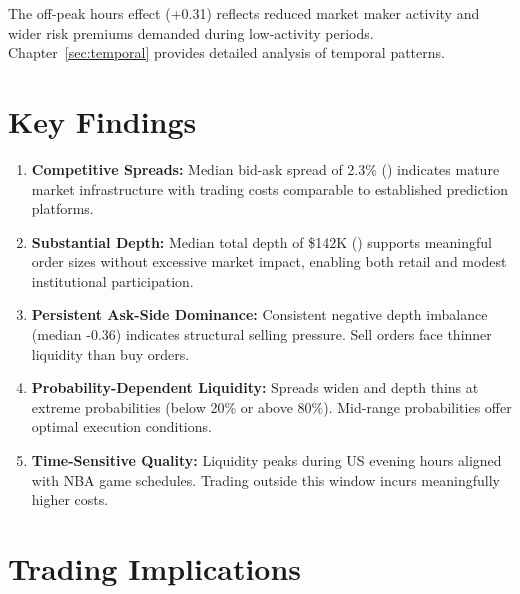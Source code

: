 The off-peak hours effect (+0.31) reflects reduced market maker activity and wider risk premiums demanded during low-activity periods. Chapter~\ref{sec:temporal} provides detailed analysis of temporal patterns.

\section{Key Findings}

\begin{keyfindings}
\begin{enumerate}
    \item \textbf{Competitive Spreads:} Median bid-ask spread of 2.3\% () indicates mature market infrastructure with trading costs comparable to established prediction platforms.

    \item \textbf{Substantial Depth:} Median total depth of \$142K () supports meaningful order sizes without excessive market impact, enabling both retail and modest institutional participation.

    \item \textbf{Persistent Ask-Side Dominance:} Consistent negative depth imbalance (median -0.36) indicates structural selling pressure. Sell orders face thinner liquidity than buy orders.

    \item \textbf{Probability-Dependent Liquidity:} Spreads widen and depth thins at extreme probabilities (below 20\% or above 80\%). Mid-range probabilities offer optimal execution conditions.

    \item \textbf{Time-Sensitive Quality:} Liquidity peaks during US evening hours aligned with NBA game schedules. Trading outside this window incurs meaningfully higher costs.
\end{enumerate}
\end{keyfindings}

\section{Trading Implications}

